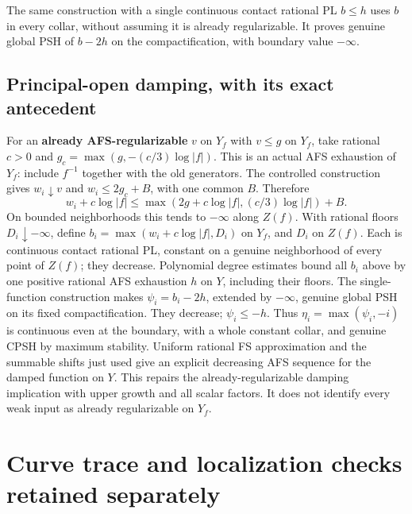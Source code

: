 \documentclass[
  11pt,
]{article}
\begin{document}
The same construction with a single continuous contact rational PL
\(b\le h\) uses \(b\) in every collar, without assuming it is already
regularizable. It proves genuine global PSH of \(b-2h\) on the
compactification, with boundary value \(-\infty\).

\subsection{Principal-open damping, with its exact
antecedent}\label{principal-open-damping-with-its-exact-antecedent}

For an \textbf{already AFS-regularizable} \(v\) on \(Y_f\) with
\(v\le g\) on \(Y_f\), take rational \(c>0\) and
\(g_c=\max(g,-(c/3)\log|f|)\). This is an actual AFS exhaustion of
\(Y_f\): include \(f^{-1}\) together with the old generators. The
controlled construction gives \(w_i\downarrow v\) and \(w_i\le2g_c+B\),
with one common \(B\). Therefore
\[w_i+c\log|f|\le\max(2g+c\log|f|,(c/3)\log|f|)+B. \tag{22}\] On bounded
neighborhoods this tends to \(-\infty\) along \(Z(f)\). With rational
floors \(D_i\downarrow-\infty\), define \(b_i=\max(w_i+c\log|f|,D_i)\)
on \(Y_f\), and \(D_i\) on \(Z(f)\). Each is continuous contact rational
PL, constant on a genuine neighborhood of every point of \(Z(f)\); they
decrease. Polynomial degree estimates bound all \(b_i\) above by one
positive rational AFS exhaustion \(h\) on \(Y\), including their floors.
The single-function construction makes \(\psi_i=b_i-2h\), extended by
\(-\infty\), genuine global PSH on its fixed compactification. They
decrease; \(\psi_i\le-h\). Thus \(\eta_i=\max(\psi_i,-i)\) is continuous
even at the boundary, with a whole constant collar, and genuine CPSH by
maximum stability. Uniform rational FS approximation and the summable
shifts just used give an explicit decreasing AFS sequence for the damped
function on \(Y\). This repairs the already-regularizable damping
implication with upper growth and all scalar factors. It does not
identify every weak input as already regularizable on \(Y_f\).

\section{Curve trace and localization checks retained
separately}\label{curve-trace-and-localization-checks-retained-separately}
\end{document}
